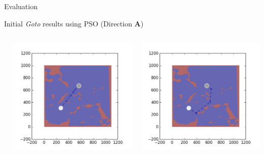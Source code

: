 \documentclass[9pt]{beamer}
\begin{document}
\begin{frame}{Evaluation}
\begin{block}{Initial \textit{Goto} results using PSO (Direction \textbf{A})}
\begin{columns}
\begin{column}{0.25\textwidth}
\begin{center}
                \end{center}
            \end{column}
            \begin{column}{0.25\textwidth}
                \begin{center}
                    \includegraphics[width=\textwidth,trim={2cm 2cm 2cm 2cm},clip]{img/EXP3RG_PathAa_-1_-1_-1_0.png}
                \end{center}
            \end{column}
            \begin{column}{0.25\textwidth}
                \begin{center}
                    \includegraphics[width=\textwidth,trim={2cm 2cm 2cm 2cm},clip]{img/EXP3RG_PathAa_-1_-1_-1_-1.png}

\end{center}
\end{column}
\end{columns}
\end{block}
\end{frame}
\end{document}
